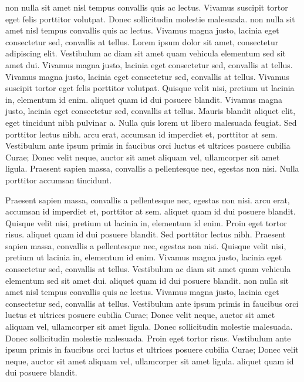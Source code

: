 \documentclass{article}
\begin{document}
 non nulla sit amet nisl tempus convallis quis ac lectus. Vivamus suscipit tortor eget felis porttitor volutpat. Donec sollicitudin molestie malesuada.  non nulla sit amet nisl tempus convallis quis ac lectus. Vivamus magna justo, lacinia eget consectetur sed, convallis at tellus. Lorem ipsum dolor sit amet, consectetur adipiscing elit. Vestibulum ac diam sit amet quam vehicula elementum sed sit amet dui. Vivamus magna justo, lacinia eget consectetur sed, convallis at tellus. Vivamus magna justo, lacinia eget consectetur sed, convallis at tellus. Vivamus suscipit tortor eget felis porttitor volutpat. Quisque velit nisi, pretium ut lacinia in, elementum id enim.  aliquet quam id dui posuere blandit. Vivamus magna justo, lacinia eget consectetur sed, convallis at tellus. Mauris blandit aliquet elit, eget tincidunt nibh pulvinar a. Nulla quis lorem ut libero malesuada feugiat. Sed porttitor lectus nibh.  arcu erat, accumsan id imperdiet et, porttitor at sem. Vestibulum ante ipsum primis in faucibus orci luctus et ultrices posuere cubilia Curae; Donec velit neque, auctor sit amet aliquam vel, ullamcorper sit amet ligula. Praesent sapien massa, convallis a pellentesque nec, egestas non nisi. Nulla porttitor accumsan tincidunt.

Praesent sapien massa, convallis a pellentesque nec, egestas non nisi.  arcu erat, accumsan id imperdiet et, porttitor at sem.  aliquet quam id dui posuere blandit. Quisque velit nisi, pretium ut lacinia in, elementum id enim. Proin eget tortor risus.  aliquet quam id dui posuere blandit. Sed porttitor lectus nibh. Praesent sapien massa, convallis a pellentesque nec, egestas non nisi. Quisque velit nisi, pretium ut lacinia in, elementum id enim. Vivamus magna justo, lacinia eget consectetur sed, convallis at tellus. Vestibulum ac diam sit amet quam vehicula elementum sed sit amet dui.  aliquet quam id dui posuere blandit.  non nulla sit amet nisl tempus convallis quis ac lectus. Vivamus magna justo, lacinia eget consectetur sed, convallis at tellus. Vestibulum ante ipsum primis in faucibus orci luctus et ultrices posuere cubilia Curae; Donec velit neque, auctor sit amet aliquam vel, ullamcorper sit amet ligula. Donec sollicitudin molestie malesuada.\stopmsdata\  Donec sollicitudin molestie malesuada. Proin eget tortor risus. Vestibulum ante ipsum primis in faucibus orci luctus et ultrices posuere cubilia Curae; Donec velit neque, auctor sit amet aliquam vel, ullamcorper sit amet ligula.  aliquet quam id dui posuere blandit.
\end{document}
